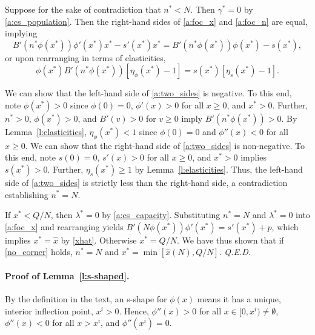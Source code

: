 \documentclass[12pt]{article}
\newcommand{\efficacy}{\phi}
\newcommand{\side}{s}
\newcommand{\xh}{\hat{x}}
\newcommand{\benefit}{B}
\newcommand{\elasticity}[1]{\eta_{#1}}
\renewcommand{\qed}{{\it Q.E.D.}}
\begin{document}
Suppose for the sake of contradiction that $n^* < N$. Then $\gamma^* = 0$ by \eqref{a:cs_population}. Then the right-hand sides of \eqref{a:foc_x} and \eqref{a:foc_n} are equal, implying 
\begin{equation}
\label{a:two_sides}
\benefit'(n^* \efficacy(x^*)) \efficacy'(x^*) x^* - \side'(x^*) x^* = \benefit'(n^* \efficacy(x^*)) \efficacy(x^*) - \side(x^*),
\end{equation}
or upon rearranging in terms of elasticities,
\begin{equation}
\label{a:two_sides}
\efficacy(x^*) \benefit'(n^* \efficacy(x^*)) \left[ \elasticity{\efficacy}(x^*) - 1 \right] = \side(x^*) \left[ \elasticity{\side}(x^*) - 1 \right].
\end{equation}

We can show that the left-hand side of \eqref{a:two_sides} is negative. To this end, note $\efficacy(x^*) > 0$ since $\efficacy(0) = 0$, $\efficacy'(x) > 0$ for all $x \geq 0$, and $x^* > 0$. Further, $n^* > 0$, $\efficacy(x^*) > 0$, and $\benefit'(v) > 0$ for $v \geq 0$ imply $\benefit'(n^* \efficacy(x^*)) > 0$. By Lemma~\ref{l:elasticities}, $\elasticity{\efficacy}(x^*) < 1$ since $\efficacy(0) = 0$ and $\efficacy''(x) < 0$ for all $x \geq 0$. We can show that the right-hand side of \eqref{a:two_sides} is non-negative. To this end, note 
$\side(0) = 0$, $\side'(x) > 0$ for all $x \geq 0$, and $x^* > 0$ implies $\side(x^*) > 0$. Further, $\elasticity{\side}(x^*) \geq 1$ by Lemma~\ref{l:elasticities}. Thus, the left-hand side of \eqref{a:two_sides} is strictly less than the right-hand side, a contradiction establishing $n^* = N$. 

If $x^* < Q/N$, then $\lambda^* = 0$ by \eqref{a:cs_capacity}. Substituting $n^* = N$ and $\lambda^* = 0$ into \eqref{a:foc_x} and rearranging yields $\benefit'(N \efficacy(x^*))\efficacy'(x^*) = \side'(x^*) + p$, which implies $x^* = \hat{x}$ by \eqref{xhat}. Otherwise $x^* = Q/N$. We have thus shown that if \eqref{no_corner} holds, $n^* = N$ and $x^* = \min [\xh(N), Q/N]$. \qed


\paragraph{Proof of Lemma~\ref{l:s-shaped}.}

By the definition in the text, an s-shape for $\efficacy(x)$ means it has a unique, interior inflection point, $x^i > 0$. Hence, 
$\efficacy''(x) > 0$ for all $x \in [0, x^i) \neq \emptyset$, $\efficacy''(x) < 0$ for all $x > x^i$, and $\efficacy''(x^i) = 0$. 
\end{document}
